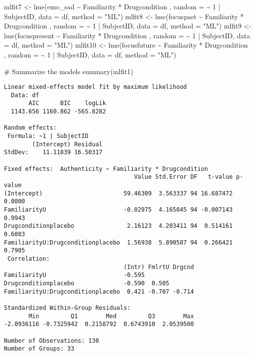 \documentclass[
  man,
  longtable,
  nolmodern,
  notxfonts,
  notimes,
  colorlinks=true,linkcolor=blue,citecolor=blue,urlcolor=blue]{apa7}
\newenvironment{Shaded}{\begin{snugshade}}{\end{snugshade}}
\newcommand{\AttributeTok}[1]{\textcolor[rgb]{0.40,0.45,0.13}{#1}}
\newcommand{\CommentTok}[1]{\textcolor[rgb]{0.37,0.37,0.37}{#1}}
\newcommand{\DecValTok}[1]{\textcolor[rgb]{0.68,0.00,0.00}{#1}}
\newcommand{\FunctionTok}[1]{\textcolor[rgb]{0.28,0.35,0.67}{#1}}
\newcommand{\NormalTok}[1]{\textcolor[rgb]{0.00,0.23,0.31}{#1}}
\newcommand{\OtherTok}[1]{\textcolor[rgb]{0.00,0.23,0.31}{#1}}
\newcommand{\SpecialCharTok}[1]{\textcolor[rgb]{0.37,0.37,0.37}{#1}}
\newcommand{\StringTok}[1]{\textcolor[rgb]{0.13,0.47,0.30}{#1}}
\begin{document}
\begin{Shaded}
\begin{Highlighting}[]
\NormalTok{mlfit7 }\OtherTok{\textless{}{-}} \FunctionTok{lme}\NormalTok{(emo\_sad }\SpecialCharTok{\textasciitilde{}}\NormalTok{ Familiarity }\SpecialCharTok{*}\NormalTok{ Drugcondition , }\AttributeTok{random =}  \SpecialCharTok{\textasciitilde{}} \DecValTok{1} \SpecialCharTok{|}\NormalTok{ SubjectID, }\AttributeTok{data =}\NormalTok{ df, }\AttributeTok{method =} \StringTok{"ML"}\NormalTok{)}
\NormalTok{mlfit8 }\OtherTok{\textless{}{-}} \FunctionTok{lme}\NormalTok{(focuspast }\SpecialCharTok{\textasciitilde{}}\NormalTok{ Familiarity }\SpecialCharTok{*}\NormalTok{ Drugcondition , }\AttributeTok{random =}  \SpecialCharTok{\textasciitilde{}} \DecValTok{1} \SpecialCharTok{|}\NormalTok{ SubjectID, }\AttributeTok{data =}\NormalTok{ df, }\AttributeTok{method =} \StringTok{"ML"}\NormalTok{)}
\NormalTok{mlfit9 }\OtherTok{\textless{}{-}} \FunctionTok{lme}\NormalTok{(focuspresent }\SpecialCharTok{\textasciitilde{}}\NormalTok{ Familiarity }\SpecialCharTok{*}\NormalTok{ Drugcondition , }\AttributeTok{random =}  \SpecialCharTok{\textasciitilde{}} \DecValTok{1} \SpecialCharTok{|}\NormalTok{ SubjectID, }\AttributeTok{data =}\NormalTok{ df, }\AttributeTok{method =} \StringTok{"ML"}\NormalTok{)}
\NormalTok{mlfit10 }\OtherTok{\textless{}{-}} \FunctionTok{lme}\NormalTok{(focusfuture }\SpecialCharTok{\textasciitilde{}}\NormalTok{ Familiarity }\SpecialCharTok{*}\NormalTok{ Drugcondition , }\AttributeTok{random =}  \SpecialCharTok{\textasciitilde{}} \DecValTok{1} \SpecialCharTok{|}\NormalTok{ SubjectID, }\AttributeTok{data =}\NormalTok{ df, }\AttributeTok{method =} \StringTok{"ML"}\NormalTok{)}

\CommentTok{\# Summarize the models}
\FunctionTok{summary}\NormalTok{(mlfit1)}
\end{Highlighting}
\end{Shaded}

\begin{verbatim}
Linear mixed-effects model fit by maximum likelihood
  Data: df 
       AIC      BIC    logLik
  1143.656 1160.862 -565.8282

Random effects:
 Formula: ~1 | SubjectID
        (Intercept) Residual
StdDev:    11.11839 16.50317

Fixed effects:  Authenticity ~ Familiarity * Drugcondition 
                                     Value Std.Error DF   t-value p-value
(Intercept)                       59.46309  3.563337 94 16.687472  0.0000
FamiliarityU                      -0.02975  4.165045 94 -0.007143  0.9943
Drugconditionplacebo               2.16123  4.203411 94  0.514161  0.6083
FamiliarityU:Drugconditionplacebo  1.56938  5.890587 94  0.266421  0.7905
 Correlation: 
                                  (Intr) FmlrtU Drgcnd
FamiliarityU                      -0.595              
Drugconditionplacebo              -0.590  0.505       
FamiliarityU:Drugconditionplacebo  0.421 -0.707 -0.714

Standardized Within-Group Residuals:
       Min         Q1        Med         Q3        Max 
-2.0936116 -0.7325942  0.2158792  0.6743910  2.0539500 

Number of Observations: 130
Number of Groups: 33 
\end{verbatim}
\end{document}
